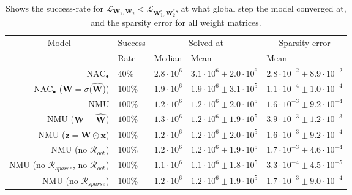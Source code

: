 \begin{table}[H]

\caption{\label{tab:function-task-static-ablation}Shows the success-rate for $\mathcal{L}_{\mathbf{W}_1, \mathbf{W}_2} < \mathcal{L}_{\mathbf{W}_1^\epsilon, \mathbf{W}_2^*}$, at what global step the model converged at, and the sparsity error for all weight matrices.}
\centering
\begin{tabular}{rllll}
\toprule
\multicolumn{1}{c}{Model} & \multicolumn{1}{c}{Success} & \multicolumn{2}{c}{Solved at} & \multicolumn{1}{c}{Sparsity error} \\
\cmidrule(l{3pt}r{3pt}){1-1} \cmidrule(l{3pt}r{3pt}){2-2} \cmidrule(l{3pt}r{3pt}){3-4} \cmidrule(l{3pt}r{3pt}){5-5}
 & Rate & Median & Mean & Mean\\
\midrule
$\mathrm{NAC}_{\bullet}$ & $40\%$ & $2.8 \cdot 10^{6}$ & $3.1 \cdot 10^{6} \pm 2.0 \cdot 10^{6}$ & $2.8 \cdot 10^{-2} \pm 8.9 \cdot 10^{-2}$\\

$\mathrm{NAC}_{\bullet}$ ($\mathbf{W} = \sigma(\mathbf{\hat{W}}$)) & $100\%$ & $1.9 \cdot 10^{6}$ & $1.9 \cdot 10^{6} \pm 3.1 \cdot 10^{5}$ & $1.1 \cdot 10^{-4} \pm 1.0 \cdot 10^{-4}$\\

NMU & $100\%$ & $1.2 \cdot 10^{6}$ & $1.2 \cdot 10^{6} \pm 2.0 \cdot 10^{5}$ & $1.6 \cdot 10^{-3} \pm 9.2 \cdot 10^{-4}$\\

NMU ($\mathbf{W} = \mathbf{\hat{W}}$) & $100\%$ & $1.3 \cdot 10^{6}$ & $1.2 \cdot 10^{6} \pm 1.9 \cdot 10^{5}$ & $3.9 \cdot 10^{-3} \pm 1.2 \cdot 10^{-3}$\\

NMU ($\mathbf{z} = \mathbf{W} \odot \mathbf{x}$) & $100\%$ & $1.2 \cdot 10^{6}$ & $1.2 \cdot 10^{6} \pm 2.0 \cdot 10^{5}$ & $1.6 \cdot 10^{-3} \pm 9.2 \cdot 10^{-4}$\\

NMU (no $\mathcal{R}_{oob}$) & $100\%$ & $1.2 \cdot 10^{6}$ & $1.2 \cdot 10^{6} \pm 1.9 \cdot 10^{5}$ & $1.7 \cdot 10^{-3} \pm 4.6 \cdot 10^{-4}$\\

NMU (no $\mathcal{R}_{sparse}$, no $\mathcal{R}_{oob}$) & $100\%$ & $1.1 \cdot 10^{6}$ & $1.1 \cdot 10^{6} \pm 1.8 \cdot 10^{5}$ & $3.3 \cdot 10^{-4} \pm 4.5 \cdot 10^{-5}$\\

NMU (no $\mathcal{R}_{sparse}$) & $100\%$ & $1.2 \cdot 10^{6}$ & $1.2 \cdot 10^{6} \pm 1.9 \cdot 10^{5}$ & $1.7 \cdot 10^{-3} \pm 9.0 \cdot 10^{-4}$\\
\bottomrule
\end{tabular}
\end{table}
